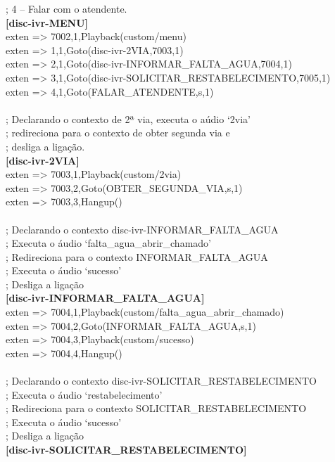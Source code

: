 \begin{anexosenv}
; 4 – Falar com o atendente. \\
\textbf{[disc-ivr-MENU]} \\
exten => 7002,1,Playback(custom/menu) \\
exten => 1,1,Goto(disc-ivr-2VIA,7003,1) \\
exten => 2,1,Goto(disc-ivr-INFORMAR\_FALTA\_AGUA,7004,1) \\
exten => 3,1,Goto(disc-ivr-SOLICITAR\_RESTABELECIMENTO,7005,1) \\
exten => 4,1,Goto(FALAR\_ATENDENTE,s,1) \\
 \\
; Declarando o contexto de 2ª via, executa o aúdio ‘2via’ \\
; redireciona para o contexto de obter segunda via e \\
; desliga a ligação. \\
\textbf{[disc-ivr-2VIA]} \\
exten => 7003,1,Playback(custom/2via) \\
exten => 7003,2,Goto(OBTER\_SEGUNDA\_VIA,s,1) \\
exten => 7003,3,Hangup() \\
 \\
; Declarando o contexto disc-ivr-INFORMAR\_FALTA\_AGUA \\
; Executa o áudio ‘falta\_agua\_abrir\_chamado’  \\
; Redireciona para o contexto INFORMAR\_FALTA\_AGUA \\
; Executa o áudio ‘sucesso’ \\
; Desliga a ligação \\
\textbf{[disc-ivr-INFORMAR\_FALTA\_AGUA]} \\
exten => 7004,1,Playback(custom/falta\_agua\_abrir\_chamado) \\
exten => 7004,2,Goto(INFORMAR\_FALTA\_AGUA,s,1) \\
exten => 7004,3,Playback(custom/sucesso) \\
exten => 7004,4,Hangup() \\
 \\
; Declarando o contexto disc-ivr-SOLICITAR\_RESTABELECIMENTO \\
; Executa o áudio ‘restabelecimento’  \\
; Redireciona para o contexto SOLICITAR\_RESTABELECIMENTO \\
; Executa o áudio ‘sucesso’ \\
; Desliga a ligação \\
\textbf{[disc-ivr-SOLICITAR\_RESTABELECIMENTO]} \\

\end{anexosenv}
